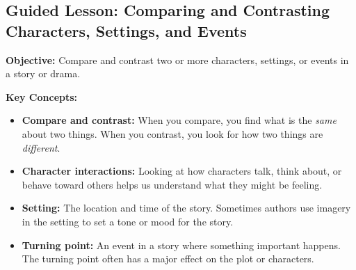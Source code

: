 \documentclass[12pt]{article}
\begin{document}
\subsection*{Guided Lesson: Comparing and Contrasting Characters, Settings, and Events}
\onehalfspacing

\begin{tcolorbox}[colframe=black!40, colback=gray!5, 
coltitle=black, colbacktitle=black!20, fonttitle=\bfseries\Large, 
title=Learning Objective, halign title=center, left=5pt, right=5pt, top=5pt, bottom=15pt]
\textbf{Objective:} Compare and contrast two or more characters, settings, or events in a story or drama.
\end{tcolorbox}

\vspace{1em}

\begin{tcolorbox}[colframe=black!60, colback=white, 
coltitle=black, colbacktitle=black!15, fonttitle=\bfseries\Large, 
title=Key Concepts and Vocabulary, halign title=center, left=10pt, right=10pt, top=10pt, bottom=15pt]
\textbf{Key Concepts:}
\begin{itemize}
    \item \textbf{Compare and contrast:} When you compare, you find what is the \textit{same} about two things. When you contrast, you look for how two things are \textit{different}.
    \item \textbf{Character interactions:} Looking at how characters talk, think about, or behave toward others helps us understand what they might be feeling. 
    \item \textbf{Setting:} The location and time of the story. Sometimes authors use imagery in the setting to set a tone or mood for the story.
    \item \textbf{Turning point:} An event in a story where something important happens. The turning point often has a major effect on the plot or characters.
\end{itemize}
\end{tcolorbox}

\vspace{1em}
\end{document}
